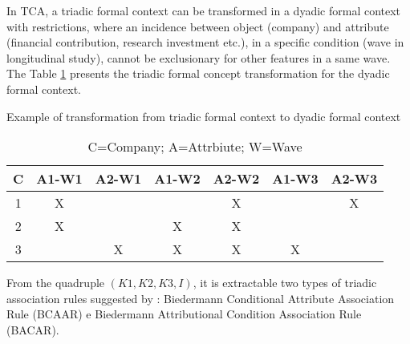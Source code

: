 \documentclass[a4paper,twoside]{article}
\begin{document}
In TCA, a triadic formal context can be transformed in a dyadic formal context with restrictions, where an incidence between object (company) and attribute (financial contribution, research investment etc.), in a specific condition (wave in longitudinal study), cannot be exclusionary for other features in a same wave. The Table \ref{Tabela:1b} presents the triadic formal concept transformation for the dyadic formal context.

\begin{table}[h!] 
\small
\scriptsize
\begin{center}
\caption{Example of transformation from triadic formal context to dyadic formal context} \label{Tabela:1b}
\begin{tabular}{c|cc|cc|cc} 
\hline
C &A1-W1&A2-W1&A1-W2&A2-W2&A1-W3&A2-W3\\
\hline
1   & X &  
    &   & X
    &   & X \\
2   & X &  
    & X & X
    &   &   \\
3   &   & X 
    & X & X
    & X &   \\
    \hline
\end{tabular}
\end{center}
\caption*{C=Company; A=Attrbiute; W=Wave}
\end{table}

From the quadruple $(K1, K2, K3, I)$, it is extractable two types of triadic association rules suggested by \cite{biedermann:97}: Biedermann Conditional Attribute Association Rule (BCAAR) e Biedermann Attributional Condition Association Rule (BACAR).
\end{document}
